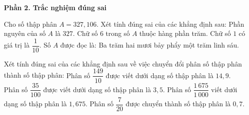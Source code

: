 \textbf{Phần 2. Trắc nghiệm đúng sai}

\begin{ex} %
Cho số thập phân $A = 327{,}106$. Xét tính đúng sai của các khẳng định sau:
\choiceTF
{\True Phần nguyên của số $A$ là $327$.}
{Chữ số $6$ trong số $A$ thuộc hàng phần trăm.}
{\True Chữ số $1$ có giá trị là $\dfrac{1}{10}$.}
{\True Số $A$ được đọc là: Ba trăm hai mươi bảy phẩy một trăm linh sáu.}
\end{ex}

\begin{ex} %
Xét tính đúng sai của các khẳng định sau về việc chuyển đổi phân số thập phân thành số thập phân:
\choiceTF
{\True Phân số $\dfrac{149}{10}$ được viết dưới dạng số thập phân là $14{,}9$.}
{Phân số $\dfrac{35}{100}$ được viết dưới dạng số thập phân là $3{,}5$.}
{\True Phân số $\dfrac{1\,675}{1\,000}$ viết dưới dạng số thập phân là $1{,}675$.}
{Phân số $\dfrac{7}{20}$ được chuyển thành số thập phân là $0{,}7$.}
\end{ex}

